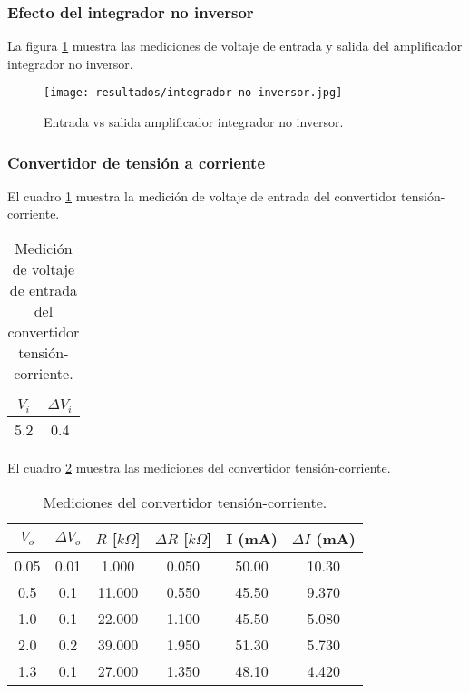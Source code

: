 \subsubsection{Efecto del integrador no inversor}

La figura \ref{fig:entrada-salida-integrador-no-inversor} muestra las mediciones de voltaje de entrada y salida del amplificador integrador no inversor.
\begin{figure}[ht]
    \centering
    \texttt{[image: resultados/integrador-no-inversor.jpg]}
    \caption{Entrada vs salida amplificador integrador no inversor.}
    \label{fig:entrada-salida-integrador-no-inversor}
\end{figure}

\subsubsection{Convertidor de tensión a corriente}

El cuadro \ref{tab:medicion-voltaje-entrada-convertidor-tension-corriente} muestra la medición de voltaje de entrada del convertidor tensión-corriente.

\begin{table}[ht]
    \centering
    \begin{tabular}{|c|c|}
        \hline
        \(V_i\) & \(\Delta V_i\) \\ \hline
        5.2 & 0.4 \\ \hline
    \end{tabular}
    \caption{Medición de voltaje de entrada del convertidor tensión-corriente.}
    \label{tab:medicion-voltaje-entrada-convertidor-tension-corriente}
\end{table}

El cuadro \ref{tab:resultados-convertidor-tension-corriente} muestra las mediciones del convertidor tensión-corriente.

\begin{table}[h!]
\centering
\begin{tabular}{|c|c|c|c|c|c|}
\hline
\(V_o\) & \(\Delta V_o\) & \(R\) [$k\Omega$] & \(\Delta R\) [$k\Omega$] & I (mA) & \(\Delta I\) (mA) \\ \hline
0.05 & 0.01 & 1.000 & 0.050 & 50.00 & 10.30 \\ \hline
0.5 & 0.1 & 11.000 & 0.550 & 45.50 & 9.370 \\ \hline
1.0 & 0.1 & 22.000 & 1.100 & 45.50 & 5.080 \\ \hline
2.0 & 0.2 & 39.000 & 1.950 & 51.30 & 5.730 \\ \hline
1.3 & 0.1 & 27.000 & 1.350 & 48.10 & 4.420 \\ \hline
\end{tabular}
\caption{Mediciones del convertidor tensión-corriente.}
\label{tab:resultados-convertidor-tension-corriente}
\end{table}

